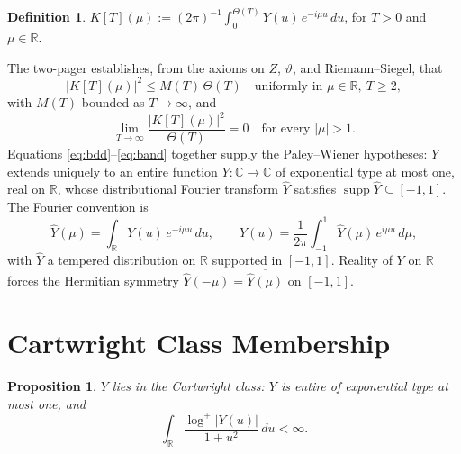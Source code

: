\documentclass[11pt,a4paper]{article}
\theoremstyle{plain}
\newtheorem{proposition}[theorem]{Proposition}
\theoremstyle{definition}
\newtheorem{definition}[theorem]{Definition}
\newcommand{\R}{\mathbb{R}}
\newcommand{\C}{\mathbb{C}}
\DeclareMathOperator{\supp}{supp}
\begin{document}
\begin{definition}\label{def:K}
$K[T](\mu):=(2\pi)^{-1}\int_0^{\Theta(T)}Y(u)\,e^{-i\mu u}\,du$, for $T>0$ and $\mu\in\R$.
\end{definition}

The two-pager establishes, from the axioms on $Z$, $\vartheta$, and Riemann--Siegel, that
\begin{equation}\label{eq:bdd}
|K[T](\mu)|^2\le M(T)\,\Theta(T)
\quad\text{uniformly in }\mu\in\R,\ T\ge 2,
\end{equation}
with $M(T)$ bounded as $T\to\infty$, and
\begin{equation}\label{eq:band}
\lim_{T\to\infty}\frac{|K[T](\mu)|^2}{\Theta(T)}=0
\quad\text{for every }|\mu|>1.
\end{equation}
Equations \eqref{eq:bdd}--\eqref{eq:band} together supply the Paley--Wiener hypotheses: $Y$ extends uniquely to an entire function $Y:\C\to\C$ of exponential type at most one, real on $\R$, whose distributional Fourier transform $\hat Y$ satisfies $\supp\hat Y\subseteq[-1,1]$. The Fourier convention is
\[
\hat Y(\mu)=\int_\R Y(u)\,e^{-i\mu u}\,du,
\qquad
Y(u)=\frac{1}{2\pi}\int_{-1}^{1}\hat Y(\mu)\,e^{i\mu u}\,d\mu,
\]
with $\hat Y$ a tempered distribution on $\R$ supported in $[-1,1]$. Reality of $Y$ on $\R$ forces the Hermitian symmetry $\hat Y(-\mu)=\overline{\hat Y(\mu)}$ on $[-1,1]$.

\section{Cartwright Class Membership}

\begin{proposition}\label{prop:cartwright}
$Y$ lies in the Cartwright class: $Y$ is entire of exponential type at most one, and
\[
\int_\R\frac{\log^+|Y(u)|}{1+u^2}\,du<\infty.
\]
\end{proposition}
\end{document}

